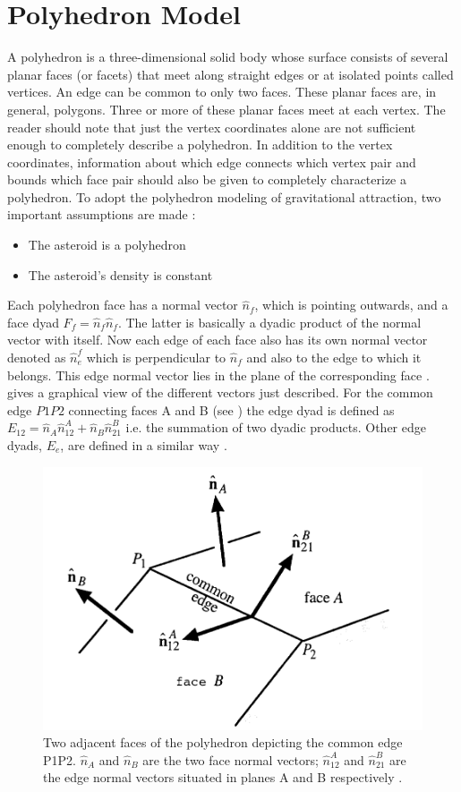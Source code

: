 \section{Polyhedron Model}
\label{polyhedron}
A polyhedron is a three-dimensional solid body whose surface consists of several planar faces (or facets) that meet along straight edges or at isolated points called vertices. An edge can be common to only two faces. These planar faces are, in general, polygons. Three or more of these planar faces meet at each vertex. The reader should note that just the vertex coordinates alone are not sufficient enough to completely describe a polyhedron. In addition to the vertex coordinates, information about which edge connects which vertex pair and bounds which face pair should also be given to completely characterize a polyhedron. To adopt the polyhedron modeling of gravitational attraction, two important assumptions are made \cite{dan_poly}:
\begin{itemize}
\item The asteroid is a polyhedron
\item The asteroid's density is constant
\end{itemize}
%
Each polyhedron face has a normal vector $\hat{n}_f$, which is pointing outwards, and a face dyad $F_f = \hat{n}_f\hat{n}_f$. The latter is basically a dyadic product of the normal vector with itself. Now each edge of each face also has its own normal vector denoted as $\hat{n}_e^f$ which is perpendicular to $\hat{n}_f$ and also to the edge to which it belongs. This edge normal vector lies in the plane of the corresponding face \cite{dan_poly}.  gives a graphical view of the different vectors just described. For the common edge $P1P2$ connecting faces A and B (see ) the edge dyad is defined as $E_{12} = \hat{n}_A \hat{n}_{12}^A + \hat{n}_B\hat{n}_{21}^B$ i.e. the summation of two dyadic products. Other edge dyads, $E_e$, are defined in a similar way \cite{dan_poly}.
%
\begin{figure}[h]
\centering
\captionsetup{justification=centering}
\includegraphics[scale=0.5]{poly_faces.png}
\caption{Two adjacent faces of the polyhedron depicting the common edge P1P2. $\hat{n}_A$ and $\hat{n}_B$ are the two face normal vectors; $\hat{n}_{12}^A$ and $\hat{n}_{21}^B$ are the edge normal vectors situated in planes A and B respectively \cite{dan_poly}.}
\label{fig:poly_face}
\end{figure}
